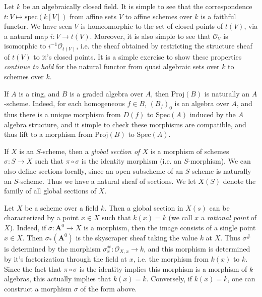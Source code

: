\begin{example}
    Let $k$ be an algebraically closed field. It is simple to see that the correspondence $t: V \mapsto \text{spec}(k[V])$ from affine sets $V$ to affine schemes over $k$ is a faithful functor. We have seen $V$ is homeomorphic to the set of closed points of $t(V)$, via a natural map $i: V \to t(V)$. Moreover, it is also simple to see that $\mathcal{O}_V$ is isomorphic to $i^{-1} \mathcal{O}_{t(V)}$, i.e. the sheaf obtained by restricting the structure sheaf of $t(V)$ to it's closed points. It is a simple exercise to show these properties \emph{continue to hold} for the natural functor from quasi algebraic sets over $k$ to schemes over $k$.
\end{example} 

\begin{example}
    If $A$ is a ring, and $B$ is a graded algebra over $A$, then $\text{Proj}(B)$ is naturally an $A$-scheme. Indeed, for each homogeneous $f \in B$, $(B_f)_0$ is an algebra over $A$, and thus there is a unique morphism from $D(f)$ to $\text{Spec}(A)$ induced by the $A$ algebra structure, and it simple to check these morphisms are compatible, and thus lift to a morphism from $\text{Proj}(B)$ to $\text{Spec}(A)$.
\end{example}

If $X$ is an $S$-scheme, then a \emph{global section of $X$} is a morphism of schemes $\sigma: S \to X$ such that $\pi \circ \sigma$ is the identity morphism (i.e. an $S$-morphism). We can also define sections locally, since an open subscheme of an $S$-scheme is naturally an $S$-scheme. Thus we have a natural sheaf of sections. We let $X(S)$ denote the family of all global sections of $X$.

\begin{example}
    Let $X$ be a scheme over a field $k$. Then a global section in $X(s)$ can be characterized by a point $x \in X$ such that $k(x) = k$ (we call $x$ a \emph{rational point} of $X$). Indeed, if $\sigma: \mathbf{A}^0 \to X$ is a morphism, then the image consists of a single point $x \in X$. Then $\sigma_*(\mathbf{A}^0)$ is the skyscraper sheaf taking the value $k$ at $X$. Thus $\sigma^{\#}$ is determined by the morphism $\sigma^{\#}_x: \mathcal{O}_{X,x} \to k$, and this morphism is determined by it's factorization through the field at $x$, i.e. the morphism from $k(x)$ to $k$. Since the fact that $\pi \circ \sigma$ is the identity implies this morphism is a morphism of $k$-algebras, this actually implies that $k(x) = k$. Conversely, if $k(x) = k$, one can construct a morphism $\sigma$ of the form above.
\end{example}

